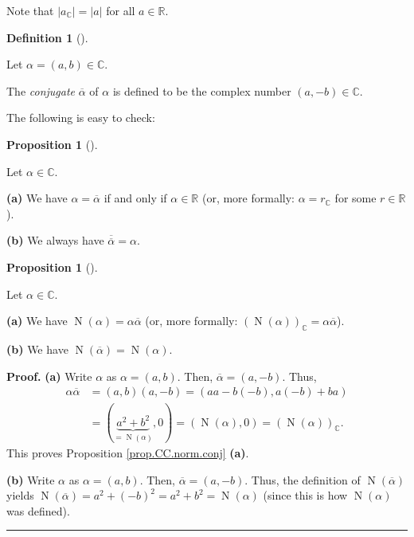 \documentclass[numbers=enddot,12pt,final,onecolumn,notitlepage]{scrartcl}%
\numberwithin{exer}{subsection}
\theoremstyle{definition}
\newtheorem{prop}[theo]{Proposition}
\newenvironment{proposition}[1][]
{\begin{prop}[#1]\begin{leftbar}}
{\end{leftbar}\end{prop}}
\newtheorem{defi}[theo]{Definition}
\newenvironment{definition}[1][]
{\begin{defi}[#1]\begin{leftbar}}
{\end{leftbar}\end{defi}}
\newenvironment{proof}[1][Proof]{\noindent\textbf{#1.} }{\ \rule{0.5em}{0.5em}}
\begin{document}
Note that $\left\vert a_{\mathbb{C}}\right\vert =\left\vert a\right\vert $ for
all $a\in\mathbb{R}$.

\begin{definition}
\label{def.CC.conj.conj}Let $\alpha=\left(  a,b\right)  \in\mathbb{C}$.

The \textit{conjugate} $\overline{\alpha}$ of $\alpha$ is defined to be the
complex number $\left(  a,-b\right)  \in\mathbb{C}$.
\end{definition}

The following is easy to check:

\begin{proposition}
\label{prop.CC.conj.conjconj}Let $\alpha\in\mathbb{C}$.

\textbf{(a)} We have $\alpha=\overline{\alpha}$ if and only if $\alpha
\in\mathbb{R}$ (or, more formally: $\alpha=r_{\mathbb{C}}$ for some
$r\in\mathbb{R}$).

\textbf{(b)} We always have $\overline{\overline{\alpha}}=\alpha$.
\end{proposition}

\begin{proposition}
\label{prop.CC.norm.conj}Let $\alpha\in\mathbb{C}$.

\textbf{(a)} We have $\operatorname*{N}\left(  \alpha\right)  =\alpha
\overline{\alpha}$ (or, more formally: $\left(  \operatorname*{N}\left(
\alpha\right)  \right)  _{\mathbb{C}}=\alpha\overline{\alpha}$).

\textbf{(b)} We have $\operatorname*{N}\left(  \overline{\alpha}\right)
=\operatorname*{N}\left(  \alpha\right)  $.
\end{proposition}

\begin{proof}
\textbf{(a)} Write $\alpha$ as $\alpha=\left(  a,b\right)  $. Then,
$\overline{\alpha}=\left(  a,-b\right)  $. Thus,%
\begin{align*}
\alpha\overline{\alpha}  &  =\left(  a,b\right)  \left(  a,-b\right)  =\left(
aa-b\left(  -b\right)  ,a\left(  -b\right)  +ba\right) \\
&  =\left(  \underbrace{a^{2}+b^{2}}_{=\operatorname*{N}\left(  \alpha\right)
},0\right)  =\left(  \operatorname*{N}\left(  \alpha\right)  ,0\right)
=\left(  \operatorname*{N}\left(  \alpha\right)  \right)  _{\mathbb{C}}.
\end{align*}
This proves Proposition \ref{prop.CC.norm.conj} \textbf{(a)}.

\textbf{(b)} Write $\alpha$ as $\alpha=\left(  a,b\right)  $. Then,
$\overline{\alpha}=\left(  a,-b\right)  $. Thus, the definition of
$\operatorname*{N}\left(  \overline{\alpha}\right)  $ yields
$\operatorname*{N}\left(  \overline{\alpha}\right)  =a^{2}+\left(  -b\right)
^{2}=a^{2}+b^{2}=\operatorname*{N}\left(  \alpha\right)  $ (since this is how
$\operatorname*{N}\left(  \alpha\right)  $ was defined).
\end{proof}
\end{document}
